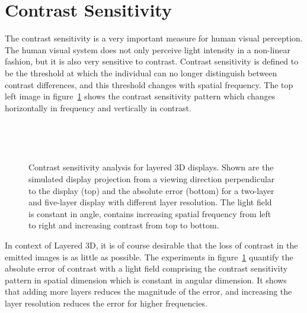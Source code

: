 \section{Contrast Sensitivity}

The contrast sensitivity is a very important measure for human visual perception.
The human visual system does not only perceive light intensity in a non-linear fashion, but it is also very sensitive to contrast.
Contrast sensitivity is defined to be the threshold at which the individual can no longer distinguish between contrast differences, and this threshold changes with spatial frequency.
The top left image in figure~\ref{fig:contrast_sensitivity} shows the contrast sensitivity pattern which changes horizontally in frequency and vertically in contrast.
\begin{figure}[tb]
	\begin{subfigure}{0.45\textwidth}
		
	\end{subfigure}\hfill%
	\begin{subfigure}{0.45\textwidth}
		
	\end{subfigure}%
	\\
	\begin{subfigure}{0.45\textwidth}
		
	\end{subfigure}\hfill%
	\begin{subfigure}{0.45\textwidth}
		
	\end{subfigure}%
	\\
	\begin{subfigure}{0.45\textwidth}
		
	\end{subfigure}\hfill%
	\begin{subfigure}{0.45\textwidth}
		
	\end{subfigure}%
	\caption[Contrast sensitivity analysis for layered 3D displays]
			{Contrast sensitivity analysis for layered 3D displays.
			 Shown are the simulated display projection from a viewing direction perpendicular to the display (top) and the absolute error (bottom) for a two-layer and five-layer display with different layer resolution.
			 The light field is constant in angle, contains increasing spatial frequency from left to right and increasing contrast from top to bottom.}
	\label{fig:contrast_sensitivity}
\end{figure}
In context of Layered 3D, it is of course desirable that the loss of contrast in the emitted images is as little as possible.
The experiments in figure~\ref{fig:contrast_sensitivity} quantify the absolute error of contrast with a light field comprising the contrast sensitivity pattern in spatial dimension which is constant in angular dimension.
It shows that adding more layers reduces the magnitude of the error, and increasing the layer resolution reduces the error for higher frequencies.

